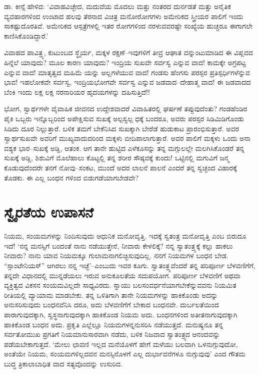 ಡಾ. ಕೀನ್ಸೆ ಹೇಳಿದ: ‘ವಿವಾಹವಿಚ್ಛೇದ, ಮದುವೆಯ ಮೊದಲು ಮತ್ತು ನಂತರದ ದುರ್ನಡತೆ ಮತ್ತು ಅನೈತಿಕ ವ್ಯವಹಾರಗಳಿಂದ ಉಂಟಾದ ಹಲವು ತೆರನಾದ ವಿಚಿತ್ರ ಮನೋರೋಗಗಳು ಅಮೇರಿಕದ ಸ್ತ್ರೀಯರ ಪಾಲಿಗೆ ಇಂದು ಸಾಕಷ್ಟುದೊರತಿವೆ. ಅಮೇರಿಕದ ಆಸ್ಪತ್ರೆಗಳಲ್ಲಿ ಇತರ ರೋಗಗಳಿಂದ ನರಳುವವರಷ್ಟೇ ಸಂಖ್ಯೆಯ ಹುಚ್ಚರೂ ಈಗಾಗಲೇ ಕಾಣಿಸಿಕೊಂಡಿದ್ದಾರೆ.’

ವಿವಾಹದ ಪಾವಿತ್ರ್ಯ, ಕುಟುಂಬದ ಸ್ಥೈರ್ಯ, ಮಕ್ಕಳ ರಕ್ಷಣೆ–ಇವುಗಳಿಗೆ ತೀವ್ರ ಆಘಾತ ವನ್ನುಂಟುಮಾಡಿದ ಈ ವಿಪ್ಲವದ ಹಿನ್ನೆಲೆ ಯಾವುದು? ಮೂಲ ಕಾರಣ ಯಾವುದು? ಇಂದ್ರಿಯ ಸುಖವೇ ಸರ್ವಸ್ವ ಎನ್ನುವ ವಾದ! ಕಾಮಕ್ಕೇ ಅಗ್ರಪಟ್ಟ ಎನ್ನುವ ವಾದ! ಮಾತೃತ್ವದ ಮಹಿಮೆ ಯನ್ನು ಅಲ್ಲಗಳೆಯುವ ವಾದ! ಗಂಡಸು ಹೆಂಗಸು ಪರಸ್ಪರ ಪ್ರತಿಸ್ಪರ್ಧಿಗಳೆನ್ನುವ ಭಾವ! ಇಹಲೋಕವೇ ಸರ್ವಸ್ವ, ಇಂದ್ರಿಯಭೋಗವೇ ಸರ್ವಸ್ವ ಎನ್ನುವ ಜಡವಾದ–ದೇಹಾತ್ಮ ವಾದ! ಈ ಜಡವಾದದ ಬೆಂಕಿ ಇಂದು ಲಕ್ಷ ಲಕ್ಷ ನರನಾರಿಯರ ಹೃದಯಗಳನ್ನು ದಹಿಸುತ್ತಿದೆ!!

ಭೋಗ, ಸ್ವಾರ್ಥಗಳೇ ವೈವಾಹಿಕ ಜೀವನದ ಉದ್ದೇಶವಾದರೆ ವಿವಾಹಿತರಲ್ಲಿ ಘರ್ಷಣೆ ತಪ್ಪುವುದೆಂತು? ಗಂಡಹೆಂಡಿರ ಪೈಕಿ ಒಬ್ಬರು ಇನ್ನೊಬ್ಬರಿಂದ ಅಪೇಕ್ಷಿಸುವ ಸುಖಕ್ಕೆ ಅಲ್ಪಸ್ವಲ್ಪ ಧಕ್ಕೆ ಬಂದರೂ, ಅವರು ಪರಸ್ಪರ ಸಿಡಿಮಿಡಿಗೊಂಡು ಸಿಡಿದು ದೂರ ನಿಲ್ಲುತ್ತಾರೆ. ಬಳಿಕ ತಮಗೆ ಬೇಕೆನಿಸಿದ ಸುಖಕ್ಕಾಗಿ ಬೇರೆಡೆ ಹುಡುಕಾಟ ಪ್ರಾರಂಭಿಸುತ್ತಾರೆ. ಅವರ ಸ್ವಾರ್ಥಸುಖವೇ ಅವರಿಗೆ ಮುಖ್ಯವಾದುದರಿಂದ ಮಕ್ಕಳು ಬೀದಿಪಾಲಾಗುತ್ತಾರೆ. ಅವರ ಪಾಲಿಗೆ ಮಕ್ಕಳು ಒಂದು ಅನಾ ವಶ್ಯಕ ಭಾರ–ಸುಖಕ್ಕೆ ಅಡ್ಡಿ, ಆತಂಕ. ಆಗ ತಾನೇ ಹುಟ್ಟಿದ ಎಳೆಕೂಸನ್ನು ತನ್ನ ಮಗ್ಗುಲಲ್ಲೇ ಮಲಗಿಸಿಕೊಂಡರೆ ತನ್ನ ಸುಖಕ್ಕೆ ಅಡ್ಡಿ, ಶಿಶುವಿಗೆ ಮೊಲೆಹಾಲು ಕೊಟ್ಟಲ್ಲಿ ತನ್ನ ಶರೀರ ಸೌಷ್ಠವಕ್ಕೆ ಕುಂದು! ಒಟ್ಟಿನಲ್ಲಿ ಮಗುವಿಗೆ ಜನ್ಮ ಕೊಡುವುದೆಂದರೇ ತನಗೆ ನೋವು–ಸಂಕಟ, ಮುಂದೆ ಅದರ ಲಾಲನೆ ಪಾಲನೆ ಎಂದರೆ ತನ್ನ ಸ್ವಚ್ಛಂದ ವಿಹಾರಕ್ಕೆ ತೊಡಕು. ಈ ಎಲ್ಲ ಬಂಧನ ಗಳಿಂದ ಬಿಡುಗಡೆಯಾಗಬೇಡವೇ?


\section{ಸ್ವೈರತೆಯ ಉಪಾಸನೆ}

ನಿಯಮ, ಸಂಯಮಗಳನ್ನು ನಿಂದಿಸುವುದು ಆಧುನಿಕ ಮನೋವೃತ್ತಿ. ಇದಕ್ಕೆ ಸ್ವತಂತ್ರ ಮನೋವೃತ್ತಿ ಎಂಬ ಬಿರುದೂ ಇದೆ! ‘ನನ್ನ ಮನಸ್ಸಿಗೆ ಬಂದಂತೆ ನಾನು ನಡೆಯುತ್ತೇನೆ, ನೀವಾರು ಕೇಳಲಿಕ್ಕೆ? ನನ್ನ ಸ್ವಾತಂತ್ರ್ಯಕ್ಕೆ ಕಲ್ಲು ಹಾಕಲು ನೀವಾರು? ನಾನು ಯಾವ ನಿಯಮಕ್ಕೂ ಗುಲಾಮನಾಗಲಿಚ್ಛಿಸುವುದಿಲ್ಲ. ನನಗೆ ನಿಯಮಗಳ ಬಂಧನ ಬೇಡ. “ಸ್ಪಾಂಟೇನಿಯಸ್​” ಆಗಿರಲು ನನ್ನ ಇಚ್ಛೆ’–ಎಂಬುದು ಇವರ ಕೂಗು. ಸ್ವಾತಂತ್ರ್ಯವೆಂದರೆ ತನ್ನ ಪರಿಪೂರ್ಣ ಬೆಳವಣಿಗೆಗೆ, ತನ್ನದೇ ವಿಧಾನದಲ್ಲಿ ಮುನ್ನಡೆಯಲು ಇರುವ ಅನುಕೂಲತೆಯ ಸದುಪಯೋಗ. ಪರಿಪೂರ್ಣ ಬೆಳವಣಿಗೆ ಅಥವಾ ವ್ಯಕ್ತಿತ್ವದ ವಿಕಸನ ಸಂಯಮವಿಲ್ಲದೇ ಸಾಧ್ಯವಿರದು. ಸ್ನಾಯು ಬಲಸಂವರ್ಧನೆಯಾಗಬೇಕೆನ್ನುವವನು ನಿಯಮಿತ ರೀತಿಯಲ್ಲಿ ವ್ಯಾಯಾಮ ಮಾಡಬೇಕು. ತನ್ನ ಒಳಿತಿಗಾಗಿ ತಾನೇ ನಿಯಮಗಳನ್ನು ಹಾಕಿಕೊಂಡು ಅದನ್ನು ಅನುಸರಿಸುವುದು ಬಂಧನವೆನಿಸಿ ದರೂ, ಅದು ಬೆಳವಣಿಗೆಗೆ ಬೇಕಾದ ಬಂಧನವೇ. ದುರ್ಬಲತೆಯಿಂದ ಪಾರಾಗುವುದಕ್ಕಾಗಿ, ಸ್ವಸ್ಥನಾಗುವುದಕ್ಕಾಗಿ ಹಾಕಿಕೊಂಡ ನಿಯಮ ಅದು. ಬಂಧನಗಳಿಂದ ಅತೀತನಾಗುವುದಕ್ಕಾಗಿ ಹಾಕಿಕೊಂಡ ಬಂಧನ ಅದು. ಪ್ರಕೃತಿ ಎಲ್ಲೆಲ್ಲೂ ನಿಯಮಗಳನ್ನನುಸರಿಸಿ ನಡೆಯುತ್ತದೆ. ಮನುಷ್ಯನೂ ತನ್ನ ಸರ್ವತೋಮುಖ ಪ್ರಗತಿಗೆ ನಿಯಮಾನುಸಾರವಾಗಿ ನಡೆದು, ಬಳಿಕ ನಿಜವಾದ ಸ್ವಾತಂತ್ರ್ಯದ ಆನಂದವನ್ನು ಪಡೆಯಬೇಕಾಗುತ್ತದೆ. ‘ಮೇಲು ಛಾವಣಿ ಇಲ್ಲದ ಮನೆಯೊಳಗೆ ಹೇಗೆ ಮಳೆಯು ಬಲವಾಗಿ ಒಳನುಗ್ಗುವುದೋ, ಅಂತೆಯೇ ನಿಯಮ, ಸಂಯಮಗಳಿಲ್ಲದವನ ಮನಸ್ಸಿನೊಳಗೆ ಎಲ್ಲ ದುರ್ಭಾವನೆಗಳೂ ನುಗ್ಗುವುವು’ ಎಂದ ಗೌತಮ ಬುದ್ಧ ತ್ರಿಕಾಲಾಬಾಧಿತ ವಾದ ಸತ್ಯವೊಂದನ್ನು ಉಸುರಿದ.

